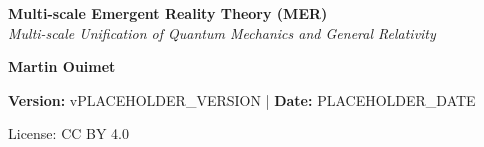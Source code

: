 \begin{titlepage}
  \centering
  {\Huge\bfseries Multi-scale Emergent Reality Theory (MER)\\[1.5em]}
  {\Large\itshape Multi-scale Unification of Quantum Mechanics and General Relativity\\[2em]}

  {\large\textbf{Martin Ouimet}\\[0.8em]}

  {\normalsize\textbf{Version:} vPLACEHOLDER_VERSION \quad | \quad \textbf{Date:} PLACEHOLDER_DATE}\\[1.5em]

  \vfill

  {\small License: CC BY 4.0}\\
  \vspace{1em}
\end{titlepage}
\clearpage
